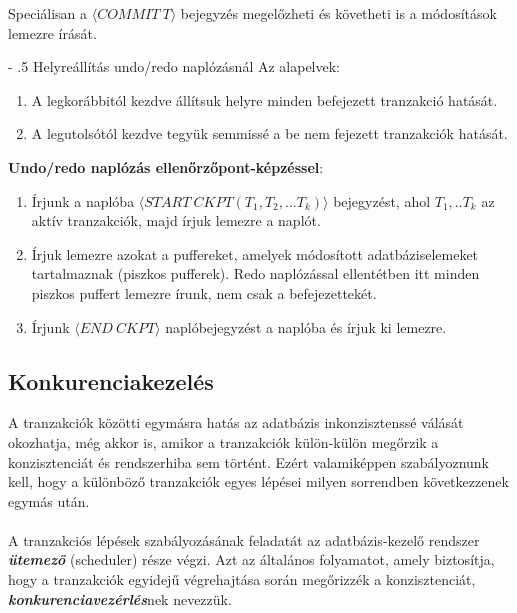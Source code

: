 \documentclass[12pt,margin=0px]{article}
\makeatletter
\renewcommand\paragraph{%
	\@startsection{paragraph}{4}{0mm}%
	{-\baselineskip}%
	{.5\baselineskip}%
	{\normalfont\normalsize\bfseries}}
\makeatother
\begin{document}
	\noindent Speciálisan a $\langle COMMIT \ T\rangle$ bejegyzés megelőzheti és követheti is a módosítások lemezre írását.
	
	\paragraph{Helyreállítás undo/redo naplózásnál}
	\noindent Az alapelvek:
	\begin{enumerate}
		\item	A legkorábbitól kezdve állítsuk helyre minden befejezett tranzakció hatását.
		\item	A legutolsótól kezdve tegyük semmissé a be nem fejezett tranzakciók hatását.
	\end{enumerate}
	
	
	\noindent \textbf{Undo/redo naplózás ellenőrzőpont-képzéssel}:
	\begin{enumerate}
		\item	Írjunk a naplóba $\langle START \ CKPT(T_{1},T_{2},...T_{k}) \rangle$ bejegyzést, ahol $T_{1},..T_{k}$ az aktív
		tranzakciók, majd írjuk lemezre a naplót.
		
		\item	Írjuk lemezre azokat a puffereket, amelyek módosított adatbáziselemeket tartalmaznak (piszkos pufferek). Redo naplózással
		ellentétben itt minden piszkos puffert lemezre írunk, nem csak a befejezettekét.
		
		\item	Írjunk $\langle END \ CKPT \rangle$ naplóbejegyzést a naplóba és írjuk ki lemezre.
	\end{enumerate}

	\subsection*{Konkurenciakezelés}
	
	A tranzakciók közötti egymásra hatás az adatbázis inkonzisztenssé válását okozhatja, még akkor is, amikor a tranzakciók külön-külön megőrzik a konzisztenciát és rendszerhiba sem történt. Ezért valamiképpen szabályoznunk kell, hogy a különböző tranzakciók egyes
	lépései milyen sorrendben következzenek egymás után. \\\\
    A tranzakciós lépések szabályozásának feladatát az adatbázis-kezelő rendszer \emph{\textbf{ütemező}} (scheduler) része végzi. Azt az általános folyamatot, amely biztosítja, hogy a tranzakciók egyidejű végrehajtása során megőrizzék a konzisztenciát, \emph{\textbf{konkurenciavezérlés}}nek nevezzük.\\
\end{document}
